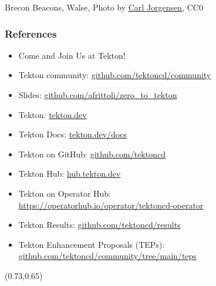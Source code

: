 \documentclass[aspectratio=169,11pt,hyperref={colorlinks=true}]{beamer}
\begin{document}
\begin{sectionwithpiclargecentral}{Brecon Beacons, Walse, Photo by \href{https://unsplash.com/@scamartist}{\underline{Carl Jorgensen}}, CC0}
\end{sectionwithpiclargecentral}

\begin{blackframe}
  \frametitle{References}
  \begin{itemize}
    \item \large Come and Join Us at Tekton!
    \item \normalsize Tekton community: \href{https://github.com/tektoncd/community}{github.com/tektoncd/community} \\
  \end{itemize}
  \begin{itemize}
    \item Slides: \href{https://github.com/afrittoli/zero_to_tekton/blob/main/zero_to_tekton.pdf}{github.com/afrittoli/zero\_to\_tekton}
    \item Tekton: \href{https://tekton.dev}{tekton.dev}
    \item Tekton Docs: \href{https://tekton.dev/docs}{tekton.dev/docs}
    \item Tekton on GitHub: \href{https://github.com/tektoncd}{github.com/tektoncd}
    \item Tekton Hub: \href{https://hub.tekton.dev}{hub.tekton.dev}
    \item Tekton on Operator Hub:\\\href{https://https://operatorhub.io/operator/tektoncd-operator}{https://operatorhub.io/operator/tektoncd-operator}
    \item Tekton Results: \href{https://github.com/tektoncd/results}{github.com/tektoncd/results}
    \item Tekton Enhancement Proposals (TEPs): \href{https://github.com/tektoncd/community/tree/main/teps\#tekton-enhancement-proposals-teps}{github.com/tektoncd/community/tree/main/teps}
  \end{itemize}
  \begin{textblock*}{0.13\paperwidth}(0.73\paperwidth,0.65\paperheight)
    
  \end{textblock*}
\end{blackframe}
\end{document}
